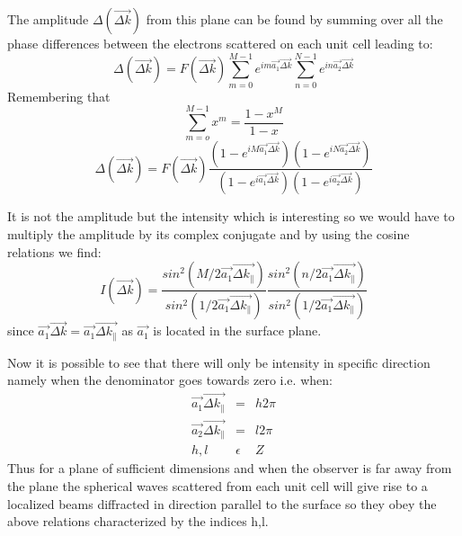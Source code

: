 The amplitude $\Delta(\overrightarrow{\Delta k})$ from this plane can be found by summing over all the phase differences between the electrons scattered on each  unit cell leading to:
\begin{equation}
\Delta(\overrightarrow{\Delta k}) = F(\overrightarrow{\Delta k}) \sum_{m=0}^{M-1} e^{im \overrightarrow{a_1} \overrightarrow{\Delta k}} \sum_{n=0}^{N-1} e^{in \overrightarrow{a_2} \overrightarrow{\Delta k}}
\end{equation}
Remembering that 
\begin{equation}
\sum_{m=o}^{M-1}x^m = \frac{1-x^M}{1-x}
\end{equation}
\begin{equation}
\Delta(\overrightarrow{\Delta k}) = F(\overrightarrow{\Delta k})\frac{(1-e^{iM \overrightarrow{a_1} \overrightarrow{\Delta k}})(1- e^{iN \overrightarrow{a_2} \overrightarrow{\Delta k}})}{(1-e^{i \overrightarrow{a_1} \overrightarrow{\Delta k}})(1-e^{i \overrightarrow{a_2} \overrightarrow{\Delta k}})}
\end{equation}


It is not the amplitude but the intensity which is interesting so we would have to multiply the amplitude by its complex conjugate and by using the cosine relations we find:
\begin{equation}
I(\overrightarrow{\Delta k}) = \frac{sin^2 (M/2 \overrightarrow{a_1} \overrightarrow{\Delta k_{\parallel}})}{sin^2 (1/2 \overrightarrow{a_1} \overrightarrow{\Delta k_{\parallel}})} \frac{sin^2 (n/2 \overrightarrow{a_1} \overrightarrow{\Delta k_{\parallel}})}{sin^2 (1/2 \overrightarrow{a_1} \overrightarrow{\Delta k_{\parallel}})}
\end{equation}
since $\overrightarrow{a_1} \overrightarrow{\Delta k} = \overrightarrow{a_1} \overrightarrow{\Delta k_{\parallel}}$ as $\overrightarrow{a_1}$ is located in the surface plane.


Now it is possible to see that there will only be intensity in specific direction namely when the denominator goes towards zero i.e. when:
\begin{eqnarray}
\overrightarrow{a_1} \overrightarrow{\Delta k_{\parallel}} &=& h2\pi\\
\overrightarrow{a_2} \overrightarrow{\Delta k_{\parallel}} &=& l2\pi\\
h,l &\epsilon& Z
\end{eqnarray}
Thus for a plane of sufficient dimensions and when the observer is far away from the plane the spherical waves scattered from each unit cell will give rise to a localized beams diffracted in direction parallel to the surface so they obey the above relations characterized by the indices h,l.


